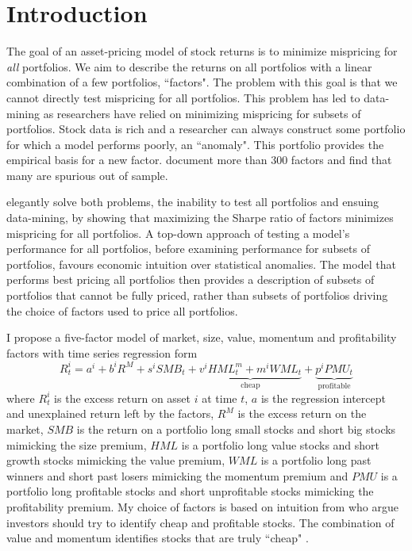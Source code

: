 
\section*{Introduction}

The goal of an asset-pricing model of stock returns is to
minimize mispricing for \emph{all} portfolios.
We aim to describe the returns on all portfolios
with a linear combination of a few portfolios, ``factors".
The problem with this goal is that we cannot directly test
mispricing for all portfolios.
This problem has led to data-mining as researchers have relied on minimizing
mispricing for subsets of portfolios.
Stock data is rich and a researcher can always construct some portfolio for
which a model performs poorly, an ``anomaly".
This portfolio provides the empirical basis for a new factor.
\textcite{harvey2016and} document more than 300 factors and
\textcite{linnainmaa2016history} find that many are spurious out of sample.

\textcite{barillas2016alpha} elegantly solve both problems,
the inability to test all portfolios and ensuing data-mining,
by showing that maximizing the Sharpe ratio of factors minimizes
mispricing for all portfolios.
A top-down approach of testing a model's performance for all portfolios,
before examining performance for subsets of portfolios,
favours economic intuition over statistical anomalies.
The model that performs best pricing all portfolios then provides a description
of subsets of portfolios that cannot be fully priced,
rather than subsets of portfolios driving
the choice of factors used to price all portfolios.

I propose a five-factor model of market, size, value, momentum and
profitability factors with time series regression form
\begin{equation} \label{eq:B16}
R_t^i = a^i+b^iR^M+s^iSMB_t+
\underbrace{v^iHML_t^m+m^iWML_t}_\text{cheap}+
\underbrace{p^iPMU_t}_\text{profitable}
\end{equation}
where $R_t^i$ is the excess return on asset $i$ at time $t$, $a$ is the
regression intercept and unexplained return left by the factors, $R^M$ is the
excess return on the market, $SMB$ is the return on a portfolio long small
stocks and short big stocks mimicking the size premium, $HML$ is a portfolio
long value stocks and short growth stocks mimicking the value premium, $WML$ is
a portfolio long past winners and short past losers mimicking the momentum
premium and $PMU$ is a portfolio long profitable stocks and short unprofitable
stocks mimicking the profitability premium.
My choice of factors is based on intuition from \textcite{graham1934security}
who argue investors should try to identify cheap and profitable stocks.
The combination of value and momentum identifies stocks that are truly ``cheap"
\parencite{kok2017facts}.

